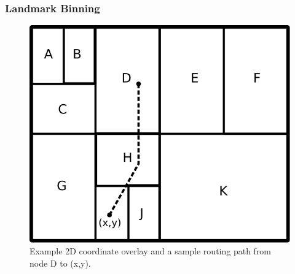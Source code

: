 

\subsubsection{Landmark Binning}\label{sec:landmark_binning}
\begin{figure}
\centering
  \includegraphics[scale=0.4]{img/algorithms/landmark_binning}
\caption{Example 2D coordinate overlay and a sample routing path from node D to
(x,y).}
\label{fig:landmark_binning}
\end{figure}

